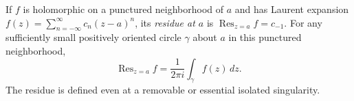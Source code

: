 
If $f$ is holomorphic on a punctured neighborhood of $a$ and has Laurent expansion $f(z)=\sum_{n=-\infty}^{\infty}c_n(z-a)^n$, its \emph{residue at $a$} is $\operatorname{Res}_{z=a}f=c_{-1}$. For any sufficiently small positively oriented circle $\gamma$ about $a$ in this punctured neighborhood,
\[
\operatorname{Res}_{z=a}f=\frac1{2\pi i}\int_\gamma f(z)\,dz.
\]
The residue is defined even at a removable or essential isolated singularity.
